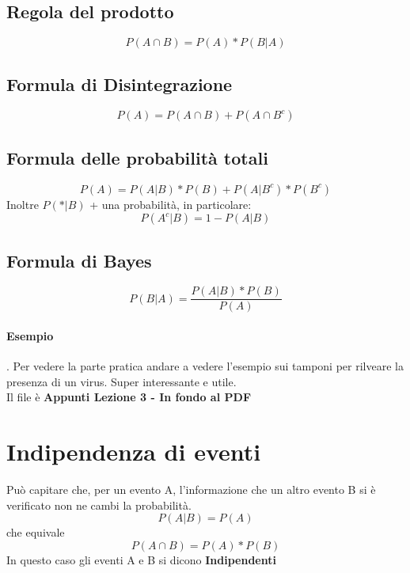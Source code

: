 \documentclass[12pt, a4paper, openany]{book}
\begin{document}
\subsection{Regola del prodotto}
\begin{equation}
    P(A \cap B) = P(A)*P(B|A)
\end{equation}
\subsection{Formula di Disintegrazione}
\begin{equation}
    P(A) = P(A \cap B) + P(A \cap B^c)
\end{equation}
\subsection{Formula delle probabilità totali}
\begin{equation}
    P(A) = P(A|B)*P(B) + P(A|B^c)*P(B^c)
\end{equation}
Inoltre $P(*|B)$ + una probabilità, in particolare:
\begin{equation}
    P(A^c|B) = 1 - P(A|B)
\end{equation}
\subsection{Formula di Bayes}
\begin{equation}
    P(B|A) = \frac{P(A|B)*P(B)}{P(A)}
\end{equation}
\paragraph{Esempio}. Per vedere la parte pratica andare a vedere l'esempio sui tamponi
per rilveare la presenza di un virus. Super interessante e utile.
\\Il file è \textbf{Appunti Lezione 3 - In fondo al PDF}

\section{Indipendenza di eventi}
Può capitare che, per un evento A, l'informazione che un altro evento B si è verificato
non ne cambi la probabilità.
\begin{equation}
    P(A|B) = P(A)
\end{equation}
che equivale
\begin{equation}
    P(A \cap B) = P(A)*P(B)
\end{equation}
In questo caso gli eventi A e B si dicono \textbf{Indipendenti}
\end{document}
